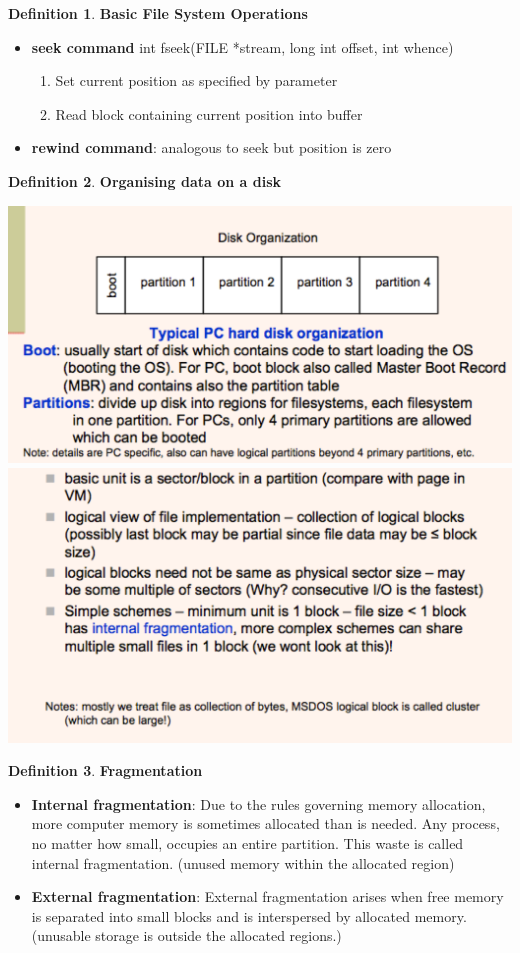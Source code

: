\documentclass[11pt,a4paper]{article}
\theoremstyle{definition}
\newtheorem{definition}{Definition}[section]
\newenvironment{myitemize}
{ \begin{itemize}
    \setlength{\itemsep}{5pt}
    \setlength{\parskip}{0pt}
    \setlength{\parsep}{0pt}     }
{ \end{itemize}                  }
\newenvironment{myenumerate}
{ \begin{enumerate}
    \setlength{\itemsep}{5pt}
    \setlength{\parskip}{0pt}
    \setlength{\parsep}{0pt}     }
{ \end{enumerate}                }
\begin{document}
\begin{definition}{\textbf{Basic File System Operations}}
\begin{myitemize}
\begin{myenumerate}
			\item When full, write buffer to disk. If next block does not exist (file is expanding): - allocate new block -update file descriptor - update bit map (free space on disk).
			\item Update file length in descriptor
		\end{myenumerate}
		\item \textbf{\textsf{seek} command} \textsf{int fseek(FILE *stream, long int offset, int whence)}
		\begin{myenumerate}
			\item Set current position as specified by parameter
			\item Read block containing current position into buffer
		\end{myenumerate}
		\item \textbf{\textsf{rewind} command}: analogous to seek but position is zero
	\end{myitemize}
\end{definition}
	
\begin{definition}{\textbf{Organising data on a disk}}

	\includegraphics[width=0.48\linewidth]{m2/diskOrgnization1}
	\includegraphics[width=0.48\linewidth]{m2/diskOrgnization2}
\end{definition}

\begin{definition}{\textbf{Fragmentation}}
	\begin{myitemize}
		\item \textbf{Internal fragmentation}: Due to the rules governing memory allocation, more computer memory is sometimes allocated than is needed. Any process, no matter how small, occupies an entire partition. This waste is called internal fragmentation. (unused memory within the allocated region)
		\item \textbf{External fragmentation}: External fragmentation arises when free memory is separated into small blocks and is interspersed by allocated memory. (unusable storage is outside the allocated regions.)
	\end{myitemize}
\end{definition}
	
\end{document}
